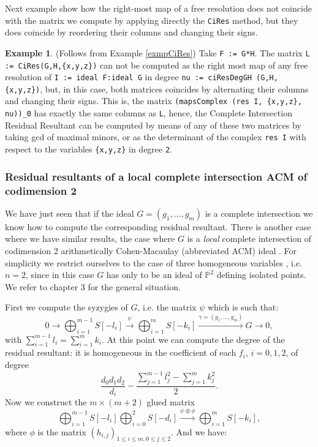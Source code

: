 \documentclass[10pt]{amsart}
\theoremstyle{plain}
\theoremstyle{definition}
\newtheorem{exmp}[thm]{Example}
\def\PP{{\mathbb{P}}}
\begin{document}
Next example show how the right-most map of a free resolution does not coincide with the matrix we compute by applying directly the \texttt{CiRes} method, but they does coincide by reordering their columns and changing their signs.

\begin{exmp}
(Follows from Example \ref{exmpCiRes}) Take \texttt{F := G*H}. The matrix \texttt{L := CiRes(G,H,\{x,y,z\})} can not be computed as the right most map of any free resolution of \texttt{I := ideal F:ideal G} in degree \texttt{nu := ciResDegGH (G,H,\{x,y,z\})}, but, in this case, both matrices coincides by alternating their columns and changing their signs. This is, the matrix \texttt{(mapsComplex (res I, \{x,y,z\}, nu))\_0} has exactly the same columns as \texttt{L}, hence, the Complete Intersection Residual Resultant can be computed by means of any of these two matrices by taking gcd of maximal minors, or as the determinant of the complex \texttt{res I} with respect to the variables \texttt{\{x,y,z\}} in degree \texttt{2}.
\end{exmp}

\subsubsection{Residual resultants of a local complete intersection ACM of codimension 2}\label{cm2res}

We have just seen that if the ideal $G=(g_1,\ldots,g_m)$ is a complete intersection we know how
to compute the corresponding residual resultant. There is another case
where we have similar results, the case where $G$ is a \emph{local}
complete intersection of codimension 2 arithmetically Cohen-Macaulay
(abbreviated ACM) ideal \cite{BusPhD}. For simplicity we restrict
ourselves to the case of three homogeneous variables \cite{Bus01},
i.e. $n=2$, since in this case $G$ has only to be an ideal of $\PP^2$
defining isolated points. We refer to \cite{BusPhD} chapter 3 for the
general situation.

First we compute the syzygies of $G$, i.e. the matrix $\psi$ which is such that:
\begin{equation}\label{resG}
0 \rightarrow \bigoplus_{i=1}^{m-1}S[-l_i]  \xrightarrow{\psi} 
\bigoplus_{i=1}^{m}S[-k_i] \xrightarrow{\gamma=(g_1,\ldots,g_m)} G
\rightarrow 0,
\end{equation}
with $\sum_{i=1}^{m-1}l_i=\sum_{i=1}^{m}k_i$.
At this point we can compute the degree of the residual resultant: it is homogeneous in the
coefficient of each $f_i$, $i=0,1,2$, of degree
$$\frac{d_0d_1d_2}{d_i}-\frac{\sum_{j=1}^{m-1}l_j^2-\sum_{j=1}^{m}k_j^2}{2}.$$
Now we construct the $m\times (m+2)$ glued matrix
$$\bigoplus_{i=1}^{m-1}S[-l_i]\bigoplus_{i=0}^{2}S[-d_i]
\xrightarrow{\psi \oplus \phi} \bigoplus_{i=1}^{m}S[-k_i],$$
where
$\phi$ is the matrix $(h_{i,j})_{1\leq i \leq m, 0\leq j \leq 2}$. And we have:
\end{document}
